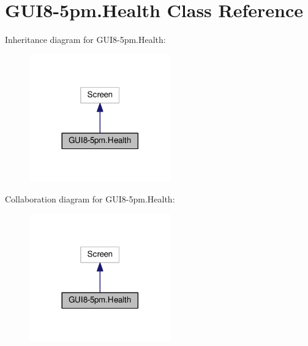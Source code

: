 \hypertarget{classGUI8-5pm_1_1Health}{}\section{G\+U\+I8-\/5pm.Health Class Reference}
\label{classGUI8-5pm_1_1Health}


Inheritance diagram for G\+U\+I8-\/5pm.Health\+:
\nopagebreak
\begin{figure}[H]
\begin{center}
\leavevmode
\includegraphics[width=173pt]{classGUI8-5pm_1_1Health__inherit__graph}
\end{center}
\end{figure}


Collaboration diagram for G\+U\+I8-\/5pm.Health\+:
\nopagebreak
\begin{figure}[H]
\begin{center}
\leavevmode
\includegraphics[width=173pt]{classGUI8-5pm_1_1Health__coll__graph}
\end{center}
\end{figure}
